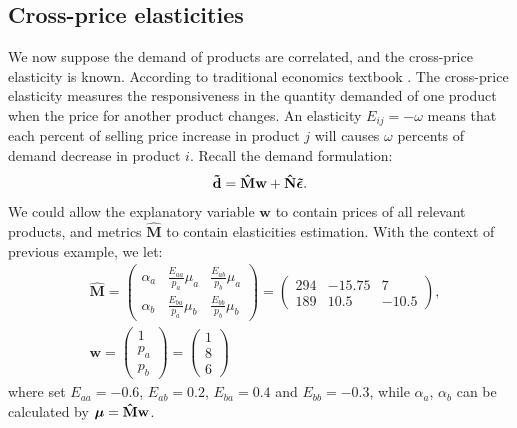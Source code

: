 \documentclass[a4paper,11pt]{article}
\begin{document}
\subsection{Cross-price elasticities} \label{sub:app2}

We now suppose the demand of products are correlated, and the cross-price elasticity is known. According to traditional economics textbook \cite{Fr08}. The cross-price elasticity measures the responsiveness in the quantity demanded of one product when the price for another product changes. An elasticity $E_{ij} = -\omega$ means that each percent of selling price increase in product $j$ will causes $\omega$ percents of demand decrease in product $i$. Recall the demand formulation:
\[
\mathbf{\tilde{d}} =  \mathbf{\hat{M}} \mathbf{w}
+ \mathbf{\hat{N}} \mbox{\boldmath$\tilde{\epsilon}$}.
\]
We could allow the explanatory variable $\mathbf{w}$ to contain prices of all relevant products, and metrics $\mathbf{\hat{M}}$ to contain elasticities estimation. With the context of previous example, we let:
\[
\begin{aligned}
&\mathbf{\hat{M}} = 
\begin{pmatrix}
\alpha_a&\frac{E_{aa}}{p_a}\mu_a&\frac{E_{ab}}{p_b}\mu_a\\
\alpha_b&\frac{E_{ba}}{p_a}\mu_b&\frac{E_{bb}}{p_b}\mu_b
\end{pmatrix} =
\begin{pmatrix}
294&-15.75&7\\
189&10.5&-10.5
\end{pmatrix},\\
&\mathbf{w} = 
\begin{pmatrix}
1\\
p_a\\
p_b
\end{pmatrix} =
\begin{pmatrix}
1\\
8\\
6
\end{pmatrix}
\end{aligned}
\]
where set $E_{aa} = -0.6$, $E_{ab} = 0.2$, $E_{ba} = 0.4$ and $E_{bb} = -0.3$, while $\alpha_a$, $\alpha_b$ can be calculated by $\mbox{\boldmath$\mu$} = \mathbf{\hat{M}}\mathbf{w}$.
\end{document}
